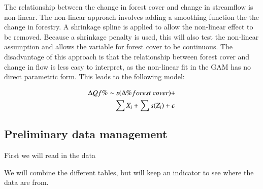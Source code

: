 \documentclass[]{elsarticle} %
\newenvironment{Shaded}{\begin{snugshade}}{\end{snugshade}}
\newcommand{\AttributeTok}[1]{\textcolor[rgb]{0.77,0.63,0.00}{#1}}
\newcommand{\FunctionTok}[1]{\textcolor[rgb]{0.00,0.00,0.00}{#1}}
\newcommand{\NormalTok}[1]{#1}
\newcommand{\OtherTok}[1]{\textcolor[rgb]{0.56,0.35,0.01}{#1}}
\newcommand{\SpecialCharTok}[1]{\textcolor[rgb]{0.00,0.00,0.00}{#1}}
\newcommand{\StringTok}[1]{\textcolor[rgb]{0.31,0.60,0.02}{#1}}
\begin{document}
The relationship between the change in forest cover and change in streamflow is non-linear. The non-linear approach involves adding a smoothing function the the change in forestry. A shrinkage spline \citep{wood2006} is applied to allow the non-linear effect to be removed. Because a shrinkage penalty is used, this will also test the non-linear assumption and allows the variable for forest cover to be continuous. The disadvantage of this approach is that the relationship between forest cover and change in flow is less easy to interpret, as the non-linear fit in the GAM has no direct parametric form. This leads to the following model:

\begin{align}
\Delta Qf \% \sim &~ s(\Delta \% forest~cover) + \notag \\ 
& \sum{X_i} + \sum{s(Z_i)} + \varepsilon \label{eq:eq3}
\end{align}

\hypertarget{preliminary-data-management}{%
\subsection{Preliminary data management}\label{preliminary-data-management}}

First we will read in the data

We will combine the different tables, but will keep an indicator to see where the data are from.

\begin{Shaded}
\end{Shaded}
\end{document}
